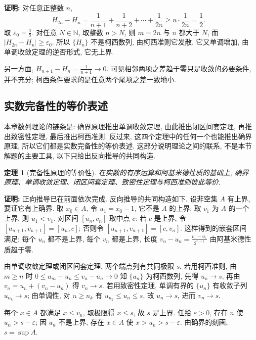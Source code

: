 \documentclass[UTF8,openany]{ctexbook}
\theoremstyle{chinesetextbook}
\newtheorem{theorem}{定理}[section]
\newenvironment{cnproof}{\par\indent\textbf{证明:} \ignorespaces}{\par}
\begin{document}
\begin{cnproof}
对任意正整数 $n$,
\[
H_{2n}-H_n=\frac1{n+1}+\frac1{n+2}+\cdots+\frac1{2n}
\ge n\cdot\frac1{2n}=\frac12.
\]
取 $\displaystyle\varepsilon_0=\frac12$. 对任意 $N\in\mathbb N$, 取整数 $n>N$, 则 $m=2n$ 与 $n$ 都大于 $N$, 而 $|H_{2n}-H_n|\ge\varepsilon_0$. 所以 $\{H_n\}$ 不是柯西数列, 由柯西准则它发散. 它又单调增加, 由单调收敛定理的逆否形式, 它无上界.

另一方面, $\displaystyle H_{n+1}-H_n=\frac1{n+1}\to0$. 可见相邻两项之差趋于零只是收敛的必要条件, 并不充分; 柯西条件要求的是任意两个尾项之差一致地小.
\end{cnproof}
\subsection{实数完备性的等价表述}
本章数列理论的链条是: 确界原理推出单调收敛定理, 由此推出闭区间套定理, 再推出致密性定理, 最后推出柯西准则. 反过来, 这四个定理中的任何一个也能推出确界原理, 所以它们都是实数完备性的等价表述. 这部分说明理论之间的联系, 不是本节解题的主要工具, 以下只给出反向推导的共同构造.
\begin{theorem}[完备性原理的等价性]
在实数的有序运算和阿基米德性质的基础上, 确界原理、单调收敛定理、闭区间套定理、致密性定理与柯西准则彼此等价.
\end{theorem}
\begin{cnproof}
正向推导已在前面依次完成. 反向推导的共同构造如下. 设非空集 $A$ 有上界, 要证它有上确界. 取 $x_0\in A$, 令 $u_1=x_0-1$, 它不是 $A$ 的上界; 取 $v_1$ 为 $A$ 的一个上界, 则 $u_1<v_1$. 对区间 $[u_n,v_n]$ 取中点 $c$: 若 $c$ 是上界, 令 $[u_{n+1},v_{n+1}]=[u_n,c]$; 否则令 $[u_{n+1},v_{n+1}]=[c,v_n]$. 这样得到的嵌套区间满足: 每个 $u_n$ 都不是上界, 每个 $v_n$ 都是上界, 长度 $\displaystyle v_n-u_n=\frac{v_1-u_1}{2^{n-1}}$ 由阿基米德性质趋于零.

由单调收敛定理或闭区间套定理, 两个端点列有共同极限 $s$. 若用柯西准则, 由 $m\ge n$ 时 $0\le u_m-u_n\le v_n-u_n\to0$ 知 $\{u_n\}$ 为柯西数列, 先得 $u_n\to s$, 再由 $v_n=u_n+(v_n-u_n)$ 得 $v_n\to s$. 若用致密性定理, 单调有界的 $\{u_n\}$ 有收敛子列 $u_{n_k}\to s$; 由单调性, 对 $n\ge n_k$ 有 $u_{n_k}\le u_n\le s$, 故 $u_n\to s$, 进而 $v_n\to s$.

每个 $x\in A$ 都满足 $x\le v_n$, 取极限得 $x\le s$, 故 $s$ 是上界. 任给 $\varepsilon>0$, 存在 $n$ 使 $u_n>s-\varepsilon$; 因 $u_n$ 不是上界, 存在 $x\in A$ 使 $x>u_n>s-\varepsilon$. 由确界的刻画, $s=\sup A$.
\end{cnproof}
\end{document}
